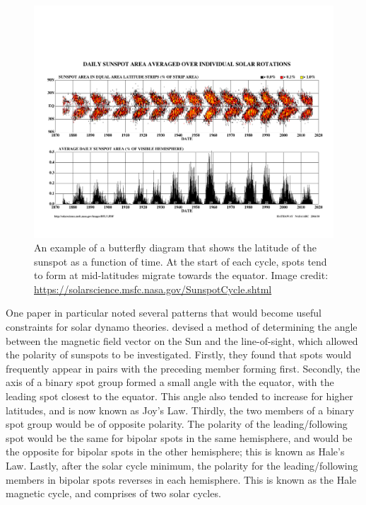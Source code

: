 \begin{figure}
    \centering
    \includegraphics[scale=0.5]{Figures/1-Introduction/butterfly_diagram_crop.pdf}
    \caption[Butterfly diagram showing the latitudes of sunspots over a solar cycle]{An example of a butterfly diagram that shows the latitude of the sunspot as a function of time. At the start of each cycle, spots tend to form at mid-latitudes migrate towards the equator. Image credit:\\ \url{https://solarscience.msfc.nasa.gov/SunspotCycle.shtml}}
    \label{fig:butterfly_diagram}
\end{figure}

One paper in particular noted several patterns that would become useful constraints for solar dynamo theories. \citet{Hale_etal_1919} devised a method of determining the angle between the magnetic field vector on the Sun and the line-of-sight, which allowed the polarity of sunspots to be investigated. Firstly, they found that spots would frequently appear in pairs with the preceding member forming first. Secondly, the axis of a binary spot group formed a small angle with the equator, with the leading spot closest to the equator. This angle also tended to increase for higher latitudes, and is now known as Joy's Law. Thirdly, the two members of a binary spot group would be of opposite polarity. The polarity of the leading/following spot would be the same for bipolar spots in the same hemisphere, and would be the opposite for bipolar spots in the other hemisphere; this is known as Hale's Law. Lastly, after the solar cycle minimum, the polarity for the leading/following members in bipolar spots reverses in each hemisphere. This is known as the Hale magnetic cycle, and comprises of two solar cycles.

